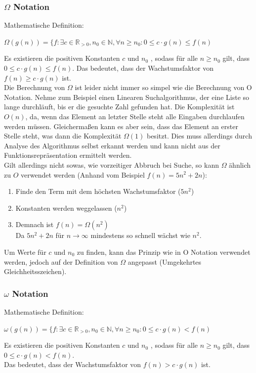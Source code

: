 \documentclass[
../../AuD-Zusammenfassung.tex,
]
{subfiles}
\begin{document}
\subsubsection{$\Omega$ Notation}
Mathematische Definition:
\begin{center}
    $\Omega(g(n)) = \{f: \exists c \in \mathbb{R}_{>0}, n_0 \in \mathbb{N}, \forall n \geq n_0:  0 \leq c \cdot g(n) \leq f(n)$
\end{center}
Es existieren die positiven Konstanten $c$ und $n_0$ , sodass für alle $n \geq n_0$ gilt, dass  $0 \leq c \cdot g(n) \leq f(n)$. 
Das bedeutet, dass der Wachstumsfaktor von $f(n) \geq c \cdot g(n)$ ist. \\

Die Berechnung von $\Omega$ ist leider nicht immer so simpel wie die Berechnung von O Notation. Nehme zum Beispiel einen Linearen Suchalgorithmus, der eine Liste so lange durchläuft, bis er die gesuchte Zahl gefunden hat. Die Komplexität ist $O(n)$, da, wenn das Element an letzter Stelle steht alle Eingaben durchlaufen werden müssen. Gleichermaßen kann es aber sein, dass das Element an erster Stelle steht, was dann die Komplexität $\Omega(1)$ besitzt. Dies muss allerdings durch Analyse des Algorithmus selbst erkannt werden und kann nicht aus der Funktionsrepräsentation ermittelt werden.\\
Gilt allerdings nicht sowas, wie vorzeitiger Abbruch bei Suche, so kann $\Omega$ ähnlich zu $O$ verwendet werden (Anhand vom Beispiel $f(n) = 5n^2 + 2n$):
\begin{enumerate}
    \item Finde den Term mit dem höchsten Wachstumsfaktor ($5n^2$)
    \item Konstanten werden weggelassen ($n^2$)
    \item Demnach ist $f(n) = \Omega(n^2)$\\
    Da $5n^2 + 2n$ für $n \to \infty$ mindestens so schnell wächst wie $n^2$.
\end{enumerate}
Um Werte für $c$ und $n_0$ zu finden, kann das Prinzip wie in O Notation verwendet werden, jedoch auf der Definition von $\Omega$ angepasst (Umgekehrtes Gleichheitsszeichen).
\newpage
\subsubsection{$\omega$ Notation}
Mathematische Definition:
\begin{center}
    $\omega(g(n)) = \{f: \exists c \in \mathbb{R}_{>0}, n_0 \in \mathbb{N}, \forall n \geq n_0:  0 \leq c \cdot g(n) < f(n)$
\end{center}
Es existieren die positiven Konstanten $c$ und $n_0$ , sodass für alle $n \geq n_0$ gilt, dass  $0 \leq c \cdot g(n) < f(n)$. \\
Das bedeutet, dass der Wachstumsfaktor von $f(n) > c \cdot g(n)$ ist. \\
\end{document}

